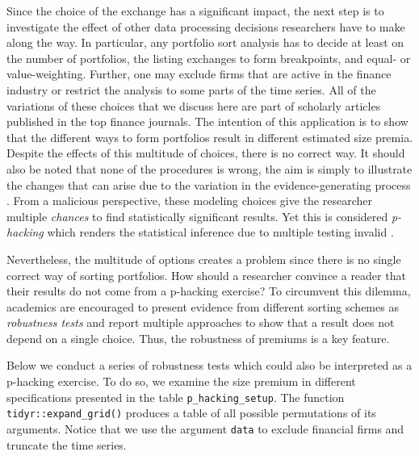 \documentclass[
]{book}
\begin{document}
Since the choice of the exchange has a significant impact, the next step is to investigate the effect of other data processing decisions researchers have to make along the way. In particular, any portfolio sort analysis has to decide at least on the number of portfolios, the listing exchanges to form breakpoints, and equal- or value-weighting. Further, one may exclude firms that are active in the finance industry or restrict the analysis to some parts of the time series. All of the variations of these choices that we discuss here are part of scholarly articles published in the top finance journals.
The intention of this application is to show that the different ways to form portfolios result in different estimated size premia. Despite the effects of this multitude of choices, there is no correct way. It should also be noted that none of the procedures is wrong, the aim is simply to illustrate the changes that can arise due to the variation in the evidence-generating process \citep{Menkveld2022}.
From a malicious perspective, these modeling choices give the researcher multiple \emph{chances} to find statistically significant results. Yet this is considered \emph{p-hacking} which renders the statistical inference due to multiple testing invalid \citep{Harvey2016}.

Nevertheless, the multitude of options creates a problem since there is no single correct way of sorting portfolios. How should a researcher convince a reader that their results do not come from a p-hacking exercise? To circumvent this dilemma, academics are encouraged to present evidence from different sorting schemes as \emph{robustness tests} and report multiple approaches to show that a result does not depend on a single choice. Thus, the robustness of premiums is a key feature.

Below we conduct a series of robustness tests which could also be interpreted as a p-hacking exercise. To do so, we examine the size premium in different specifications presented in the table \texttt{p\_hacking\_setup}. The function \texttt{tidyr::expand\_grid()} produces a table of all possible permutations of its arguments. Notice that we use the argument \texttt{data} to exclude financial firms and truncate the time series.
\end{document}
